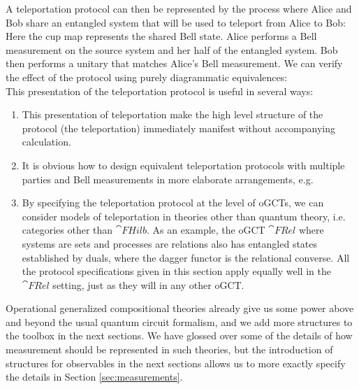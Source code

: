 \begin{example}
A teleportation protocol can then be represented by the process where Alice and Bob share an entangled system that will be used to teleport from Alice to Bob:
\begin{equation}

\end{equation}
Here the cup map represents the shared Bell state.  Alice performs a Bell measurement on the source system and her half of the entangled system. Bob then performs a unitary that matches Alice's Bell measurement. We can verify the effect of the protocol using purely diagrammatic equivalences:
\begin{equation}
\label{eq:teleportderive}

\end{equation}
This presentation of the teleportation protocol is useful in several ways:
\begin{enumerate}
\item This presentation of teleportation make the high level structure of the protocol (the teleportation) immediately manifest without accompanying calculation.
\item It is obvious how to design equivalent teleportation protocols with multiple parties and Bell measurements in more elaborate arrangements, e.g.
\begin{equation}

\end{equation}
\item By specifying the teleportation protocol at the level of oGCTs, we can consider models of teleportation in theories other than quantum theory, i.e. categories other than $\cat{FHilb}$. As an example, the oGCT $\cat{FRel}$ where systems are sets and processes are relations also has entangled states established by duals, where the dagger functor is the relational converse. All the protocol specifications given in this section apply equally well in the $\cat{FRel}$ setting, just as they will in any other oGCT.
\end{enumerate}
\end{example}

Operational generalized compositional theories already give us some power above and beyond the usual quantum circuit formalism, and we add more structures to the toolbox in the next sections.  We have glossed over some of the details of how measurement should be represented in such theories, but the introduction of structures for observables in the next sections allows us to more exactly specify the details in Section \ref{sec:measurements}. 

